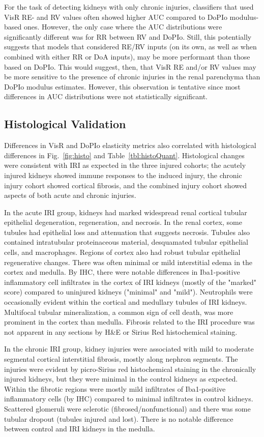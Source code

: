 For the task of detecting kidneys with only chronic injuries, classifiers that used VisR RE- and RV values often showed higher AUC compared to DoPIo modulus-based ones. However, the only case where the AUC distributions were significantly different was for RR between RV and DoPIo. Still, this potentially suggests that models that considered RE/RV inputs (on its own, as well as when combined with either RR or DoA inputs), may be more performant than those based on DoPIo. This would suggest, then, that VisR RE and/or RV values may be more sensitive to the presence of chronic injuries in the renal parenchyma than DoPIo modulus estimates. However, this observation is tentative since most differences in AUC distributions were not statistically significant.

\subsection{Histological Validation}

Differences in VisR and DoPIo elasticity metrics also correlated with histological differences in Fig.~\ref{fig:histo} and Table~\ref{tbl:histoQuant}. Histological changes were consistent with IRI as expected in the three injured cohorts; the acutely injured kidneys showed immune responses to the induced injury, the chronic injury cohort showed cortical fibrosis, and the combined injury cohort showed aspects of both acute and chronic injuries.

In the acute IRI group, kidneys had marked widespread renal cortical tubular epithelial degeneration, regeneration, and necrosis. In the renal cortex, some tubules had epithelial loss and attenuation that suggests necrosis. Tubules also contained intratubular proteinaceous material, desquamated tubular epithelial cells, and macrophages. Regions of cortex also had robust tubular epithelial regenerative changes. There was often minimal or mild interstitial edema in the cortex and medulla. By IHC, there were notable differences in Iba1-positive inflammatory cell infiltrates in the cortex of IRI kidneys (mostly of the "marked" score) compared to uninjured kidneys ("minimal" and "mild"). Neutrophils were occasionally evident within the cortical and medullary tubules of IRI kidneys. Multifocal tubular mineralization, a common sign of cell death, was more prominent in the cortex than medulla. Fibrosis related to the IRI procedure was not apparent in any sections by H\&E or Sirius Red histochemical staining.

In the chronic IRI group, kidney injuries were associated with mild to moderate segmental cortical interstitial fibrosis, mostly along nephron segments. The injuries were evident by picro-Sirius red histochemical staining in the chronically injured kidneys, but they were minimal in the control kidneys as expected. Within the fibrotic regions were mostly mild infiltrates of Iba1-positive inflammatory cells (by IHC) compared to minimal infiltrates in control kidneys. Scattered glomeruli were sclerotic (fibrosed/nonfunctional) and there was some tubular dropout (tubules injured and lost). There is no notable difference between control and IRI kidneys in the medulla.

